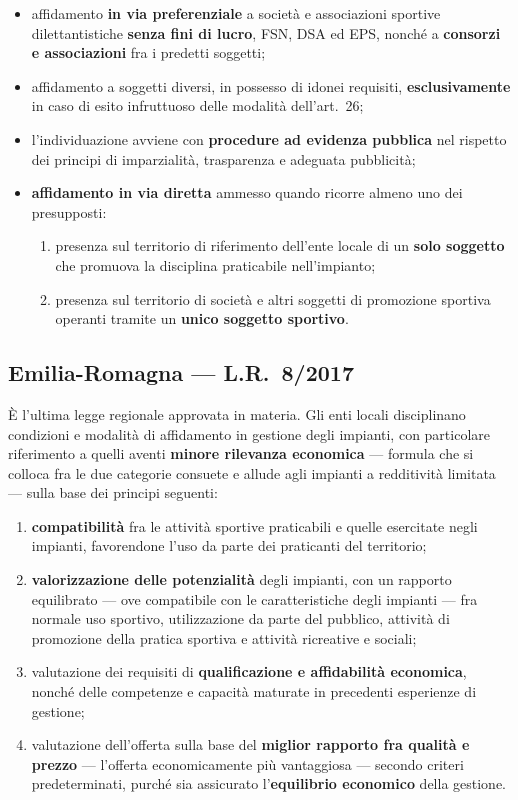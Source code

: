 \begin{itemize}
  \item affidamento \textbf{in via preferenziale} a società e associazioni sportive
    dilettantistiche \textbf{senza fini di lucro}, FSN, DSA ed EPS, nonché a \textbf{consorzi e
    associazioni} fra i predetti soggetti;
  \item affidamento a soggetti diversi, in possesso di idonei requisiti, \textbf{esclusivamente}
    in caso di esito infruttuoso delle modalità dell'art.\ 26;
  \item l'individuazione avviene con \textbf{procedure ad evidenza pubblica} nel rispetto dei
    principi di imparzialità, trasparenza e adeguata pubblicità;
  \item \textbf{affidamento in via diretta} ammesso quando ricorre almeno uno dei presupposti:
    \begin{enumerate}
      \item[a)] presenza sul territorio di riferimento dell'ente locale di un \textbf{solo
        soggetto} che promuova la disciplina praticabile nell'impianto;
      \item[b)] presenza sul territorio di società e altri soggetti di promozione sportiva
        operanti tramite un \textbf{unico soggetto sportivo}.
    \end{enumerate}
\end{itemize}

\subsection{Emilia-Romagna --- L.R.\ 8/2017}

È l'ultima legge regionale approvata in materia. Gli enti locali disciplinano condizioni e
modalità di affidamento in gestione degli impianti, con particolare riferimento a quelli aventi
\textbf{minore rilevanza economica} --- formula che si colloca fra le due categorie consuete e
allude agli impianti a redditività limitata --- sulla base dei principi seguenti:

\begin{enumerate}
  \item[a)] \textbf{compatibilità} fra le attività sportive praticabili e quelle esercitate negli
    impianti, favorendone l'uso da parte dei praticanti del territorio;
  \item[b)] \textbf{valorizzazione delle potenzialità} degli impianti, con un rapporto equilibrato
    --- ove compatibile con le caratteristiche degli impianti --- fra normale uso sportivo,
    utilizzazione da parte del pubblico, attività di promozione della pratica sportiva e attività
    ricreative e sociali;
  \item[c)] valutazione dei requisiti di \textbf{qualificazione e affidabilità economica}, nonché
    delle competenze e capacità maturate in precedenti esperienze di gestione;
  \item[d)] valutazione dell'offerta sulla base del \textbf{miglior rapporto fra qualità e prezzo}
    --- l'offerta economicamente più vantaggiosa --- secondo criteri predeterminati, purché sia
    assicurato l'\textbf{equilibrio economico} della gestione.
\end{enumerate}

